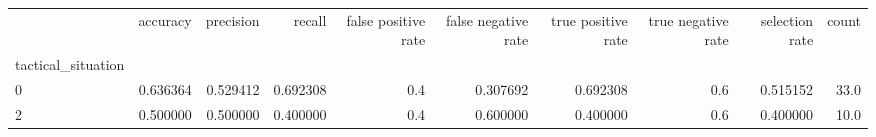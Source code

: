 \begin{tabular}{lrrrrrrrrr}
\toprule
{} &  accuracy &  precision &    recall &  false positive rate &  false negative rate &  true positive rate &  true negative rate &  selection rate &  count \\
tactical\_situation &           &            &           &                      &                      &                     &                     &                 &        \\
\midrule
0                  &  0.636364 &   0.529412 &  0.692308 &                  0.4 &             0.307692 &            0.692308 &                 0.6 &        0.515152 &   33.0 \\
2                  &  0.500000 &   0.500000 &  0.400000 &                  0.4 &             0.600000 &            0.400000 &                 0.6 &        0.400000 &   10.0 \\
\bottomrule
\end{tabular}
